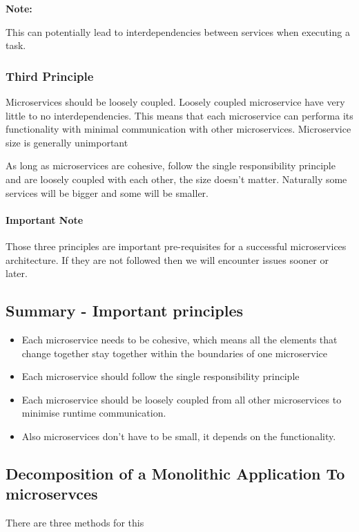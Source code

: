 \documentclass[a4paper, 11pt]{book}
\newenvironment{note}{
    \begin{siderule}
        \textbf{Note: }
        }{
    \end{siderule}}
\begin{document}
    \begin{note}
        This can potentially lead to interdependencies between services when executing a task.
    \end{note}

    \subsubsection{Third Principle}
    Microservices should be loosely coupled.
    Loosely coupled microservice have very little to no interdependencies.
    This means that each microservice can performa its functionality with minimal communication with other microservices.
    Microservice size is generally unimportant

    As long as microservices are cohesive, follow the single responsibility principle and are loosely coupled with each other, the size doesn't matter.
    Naturally some services will be bigger and some will be smaller.

    \paragraph{Important Note}
    Those three principles are important pre-requisites for a successful microservices architecture.
    If they are not followed then we will encounter issues sooner or later.

    \subsection{Summary - Important principles}
    \begin{itemize}
        \item Each microservice needs to be cohesive, which means all the elements that change together stay together within the boundaries of one microservice
        \item Each microservice should follow the single responsibility principle
        \item Each microservice should be loosely coupled from all other microservices to minimise runtime communication.
        \item Also microservices don't have to be small, it depends on the functionality.
    \end{itemize}

    \subsection{Decomposition of a Monolithic Application To microservces}
    There are three methods for this
\end{document}
